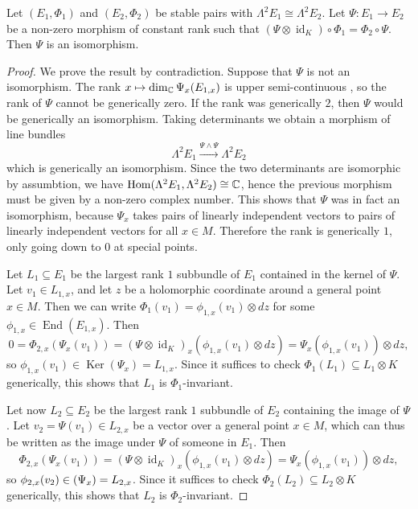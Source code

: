 \documentclass[A4paper, 12pt, british, reqno]{amsart}
\DeclareMathOperator{\Hom}{Hom}
\DeclareMathOperator{\End}{End}
\DeclareMathOperator{\id}{id}
\let\Im\relax
\DeclareMathOperator{\Im}{Im}
\DeclareMathOperator{\Ker}{Ker}
\newcommand{\ot}{\otimes}
\begin{document}
\begin{prop}
    Let $(E_{1},\Phi_{1})$ and $(E_{2},\Phi_{2})$ be stable pairs with $\Lambda^{2}E_{1}\cong \Lambda^{2}E_{2}$.
    Let $\Psi\colon E_{1}\to E_{2}$ be a non-zero morphism of constant rank such that $(\Psi\ot \id_{K}) \circ \Phi_{1}=\Phi_{2}\circ \Psi$.
    Then $\Psi$ is an isomorphism.
    \begin{proof}
	We prove the result by contradiction.
	Suppose that $\Psi$ is not an isomorphism.
	The rank $x\mapsto \dim_{\mathbb{C}}\Psi_{x}(E_{1,x})$ is upper semi-continuous \cite[Proposition 1.3.2]{ati89}, so the rank of $\Psi$ cannot be generically zero.
	If the rank was generically $2$, then $\Psi$ would be generically an isomorphism.
	Taking determinants we obtain a morphism of line bundles
	\[ \Lambda^{2}E_{1}\xrightarrow{\Psi\wedge \Psi} \Lambda^{2}E_{2} \]
	which is generically an isomorphism.
	Since the two determinants are isomorphic by assumbtion, we have $\Hom(\Lambda^{2}E_{1},\Lambda^{2}E_{2})\cong \C$, hence the previous morphism must be given by a non-zero complex number.
	This shows that $\Psi$ was in fact an isomorphism, because $\Psi_{x}$ takes pairs of linearly independent vectors to pairs of linearly independent vectors for all $x\in M$.
	Therefore the rank is generically $1$, only going down to $0$ at special points.

	Let $L_{1}\subseteq E_{1}$ be the largest rank $1$ subbundle of $E_{1}$ contained in the kernel of $\Psi$.
	Let $v_{1}\in L_{1,x}$, and let $z$ be a holomorphic coordinate around a general point $x\in M$.
	Then we can write $\Phi_{1}(v_{1})=\phi_{1,x}(v_{1})\ot dz$ for some $\phi_{1,x}\in \End(E_{1,x})$.
	Then
	\[ 0=\Phi_{2,x}(\Psi_{x}(v_{1}))=(\Psi\ot \id_{K})_{x}(\phi_{1,x}(v_{1})\ot dz)=\Psi_{x}(\phi_{1,x}(v_{1}))\ot dz, \]
	so $\phi_{1,x}(v_{1})\in \Ker(\Psi_{x})=L_{1,x}$.
	Since it suffices to check $\Phi_{1}(L_{1})\subseteq L_{1}\ot K$ generically, this shows that $L_{1}$ is $\Phi_{1}$-invariant.

	Let now $L_{2}\subseteq E_{2}$ be the largest rank $1$ subbundle of $E_{2}$ containing the image of $\Psi$.
	Let $v_{2}=\Psi(v_{1})\in L_{2,x}$ be a vector over a general point $x\in M$, which can thus be written as the image under $\Psi$ of someone in $E_{1}$.
	Then
	\[ \Phi_{2,x}(\Psi_{x}(v_{1}))=(\Psi\ot \id_{K})_{x}(\phi_{1,x}(v_{1})\ot dz)=\Psi_{x}(\phi_{1,x}(v_{1}))\ot dz, \]
	so $\phi_{2,x}(v_{2})\in \Im(\Psi_{x})=L_{2,x}$.
	Since it suffices to check $\Phi_{2}(L_{2})\subseteq L_{2}\ot K$ generically, this shows that $L_{2}$ is $\Phi_{2}$-invariant.


\end{proof}
\end{prop}
\end{document}
